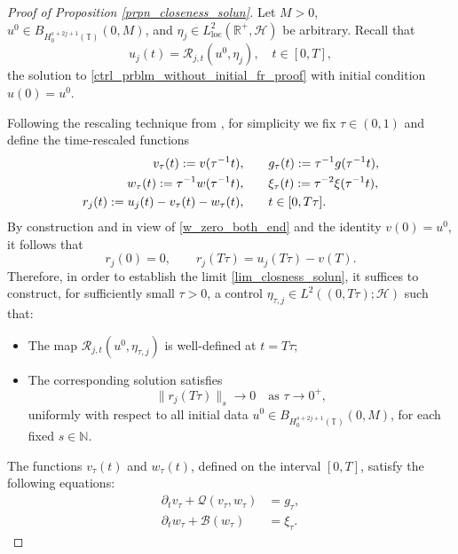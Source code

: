 \documentclass[10pt, reqno]{amsart}
\numberwithin{equation}{section}
\begin{document}
\begin{proof}[Proof of Proposition \ref{prpn_closeness_solun}] 
	Let \( M > 0 \), \( u^0 \in B_{H^{s + 2j + 1}_0(\mathbb{T}) }(0, M)\), and \( \eta_j \in L^2_{\mathrm{loc}}(\mathbb{R}^+, \mathcal{H}) \) be arbitrary. Recall that
	\[
	u_j(t) = \mathcal{R}_{j, t}(u^0, \eta_j), \quad t \in [0, T],
	\]
	the solution to \eqref{ctrl_prblm_without_initial_fr_proof} with initial condition \( u(0) = u^0 \).
	
	Following the rescaling technique from \cite{Nersesyan_2021_Sicon}, for simplicity we fix \( \tau \in (0, 1) \) and define the time-rescaled functions
	\begin{align}\label{tau_time_scaling}
		v_\tau(t) := v(\tau^{-1}t), \qquad &g_\tau(t) := \tau^{-1} g(\tau^{-1}t), \notag \\
		w_\tau(t) := \tau^{-1} w(\tau^{-1}t), \qquad &\xi_\tau(t) := \tau^{-2} \xi(\tau^{-1}t), \notag \\
		r_j(t) := u_j(t) - v_\tau(t) - w_\tau(t), \qquad &t \in [0, T\tau].
	\end{align}
By construction and in view of \eqref{w_zero_both_end} and the identity \( v(0) = u^0 \), it follows that
\begin{equation}\label{boundary_of_r}
	r_j(0) = 0, \qquad r_j(T\tau) = u_j(T\tau) - v(T).
\end{equation}
Therefore, in order to establish the limit \eqref{lim_closness_solun}, it suffices to construct, for sufficiently small \( \tau > 0 \), a control \( \eta_{\tau, j} \in L^2((0, T\tau); \mathcal{H}) \) such that:
\begin{itemize}
	\item[(i)] The map \( \mathcal{R}_{j, t}(u^0, \eta_{\tau,j}) \) is well-defined at $t = T\tau$;
	\item[(ii)] The corresponding solution satisfies
	\begin{equation}\label{limit_of_r}
		\|r_j(T\tau)\|_s \longrightarrow 0 \quad \text{as } \tau \to 0^+,
	\end{equation}
	uniformly with respect to all initial data \( u^0 \in  B_{H^{s + 2j + 1}_0(\mathbb{T}) }(0, M) \), for each fixed \( s \in \mathbb{N} \).
\end{itemize}

The functions \( v_{\tau}(t) \) and \( w_{\tau}(t) \), defined on the interval \( [0, T] \), satisfy the following equations:
\begin{align*}
	\partial_t v_{\tau} + \mathcal{Q}(v_{\tau}, w_{\tau}) &= g_{\tau}, \\
	\partial_t w_{\tau} + \mathcal{B}(w_{\tau}) &= \xi_{\tau}.
\end{align*}


\end{proof}
\end{document}
